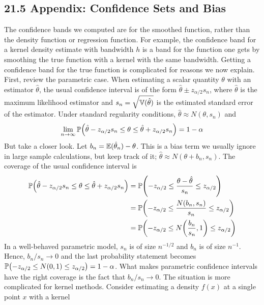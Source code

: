 \subsection*{21.5 Appendix: Confidence Sets and Bias}\label{appendix:nonparametric}
The confidence bands we computed are for the smoothed function, rather
than the density function or regression function. For example, the
confidence band for a kernel density estimate with bandwidth \(h\) is a
band for the function one gets by smoothing the true function with a
kernel with the same bandwidth. Getting a confidence band for the true
function is complicated for reasons we now explain.
First,  review the parametric case. When estimating a scalar
quantity \(\theta\) with an estimator \(\hat{\theta}\), the usual
confidence interval is of the form
\(\hat{\theta} \pm z_{\alpha / 2} s_{n}\), where \(\hat{\theta}\) is the
maximum likelihood estimator and
\(s_{n} = \sqrt{\operatorname{\mathbb{V}}(\hat{\theta})}\) is the estimated standard
error of the estimator. Under standard regularity conditions,
\(\hat{\theta} \approx N(\theta, s_{n})\) and
\[
\lim_{n \rightarrow \infty} \PROB \left( \hat{\theta} - z_{\alpha / 2} s_{n} \leq \theta \leq \hat{\theta} + z_{\alpha / 2} s_{n} \right) = 1 - \alpha
\]
But  take a closer look.
Let \(b_{n} = \operatorname{\mathbb{E}}(\hat{\theta}_{n}) - \theta\). This is a bias term
we usually ignore in large sample calculations, but  keep track of
it; \(\hat{\theta} \approx N(\theta + b_{n}, s_{n})\). The coverage of the
usual confidence interval is
\begin{align*}
\PROB\left(\hat{\theta} - z_{\alpha / 2} s_{n} \leq \theta \leq \hat{\theta} + z_{\alpha / 2} s_{n} \right)
&= \PROB\left(- z_{\alpha / 2}  \leq \frac{\theta - \hat{\theta}}{s_{n}} \leq z_{\alpha / 2}\right) \\
&= \PROB\left(- z_{\alpha / 2}  \leq \frac{N(b_{n}, s_{n})}{s_{n}} \leq z_{\alpha / 2}\right) \\
&= \PROB\left(- z_{\alpha / 2}  \leq N\left(\frac{b_{n}}{s_{n}}, 1\right) \leq z_{\alpha / 2}\right)
\end{align*}
In a well-behaved parametric model, \(s_{n}\) is of size \(n^{-1/2}\) and
\(b_{n}\) is of size \(n^{-1}\). Hence, \(b_{n} / s_{n} \rightarrow 0\) and
the last probability statement becomes
\(\PROB\left(- z_{\alpha / 2} \leq N\left(0, 1\right) \leq z_{\alpha / 2}\right) = 1 - \alpha\).
What makes parametric confidence intervals have the right coverage is
the fact that \(b_{n} / s_{n} \rightarrow 0\).
The situation is more complicated for kernel methods. Consider
estimating a density \(f(x)\) at a single point \(x\) with a kernel
